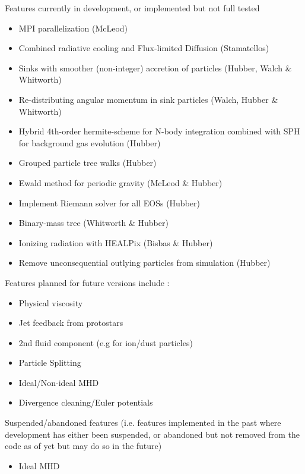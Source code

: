 \documentclass[a4paper]{article}
\begin{document}
\noindent Features currently in development, or implemented but not full tested
\begin{itemize}
\item MPI parallelization (McLeod)
\item Combined radiative cooling and Flux-limited Diffusion (Stamatellos)
\item Sinks with smoother (non-integer) accretion of particles (Hubber, Walch \& Whitworth)
\item Re-distributing angular momentum in sink particles (Walch, Hubber \& Whitworth)
\item Hybrid 4th-order hermite-scheme for N-body integration combined with SPH for background gas evolution (Hubber)
\item Grouped particle tree walks (Hubber)
\item Ewald method for periodic gravity (McLeod \& Hubber)
\item Implement Riemann solver for all EOSs (Hubber)
\item Binary-mass tree (Whitworth \& Hubber)
\item Ionizing radiation with HEALPix (Bisbas \& Hubber)
\item Remove unconsequential outlying particles from simulation (Hubber)
\end{itemize}

\noindent Features planned for future versions include : 
\begin{itemize}
\item Physical viscosity
\item Jet feedback from protostars
\item 2nd fluid component (e.g for ion/dust particles) 
\item Particle Splitting 
\item Ideal/Non-ideal MHD 
\item Divergence cleaning/Euler potentials
\end{itemize}


\noindent Suspended/abandoned features (i.e. features implemented in the past where development has either been suspended, or abandoned but not removed from the code as of yet but may do so in the future)
\begin{itemize}
\item Ideal MHD
\end{itemize}

\newpage


\end{document}
